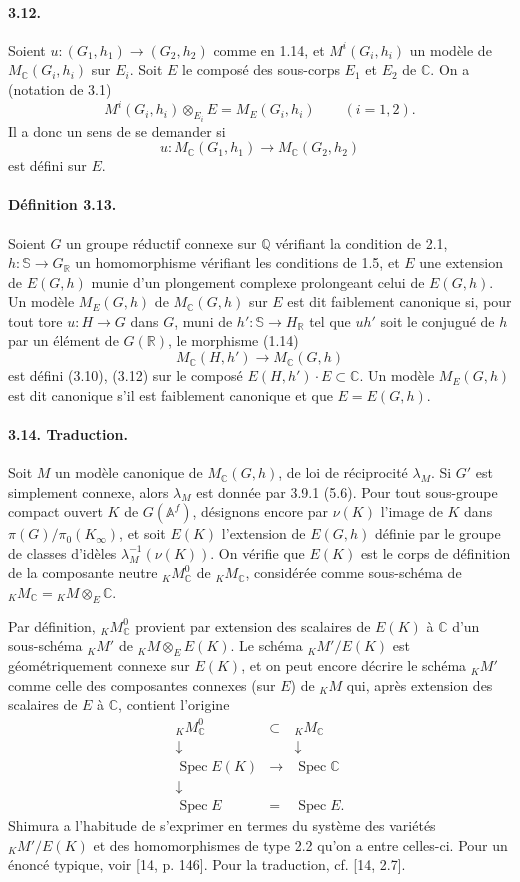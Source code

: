 \documentclass[10pt]{article}
\newcommand{\Af}{\mathbb A^f}
\newcommand{\C}{\mathbb C}
\newcommand{\Q}{\mathbb Q}
\newcommand{\R}{\mathbb R}
\newcommand{\bS}{\mathbb S}
\newcommand{\MC}{M_{\C}}
\newcommand{\Spec}{\operatorname{Spec}}
\begin{document}
\paragraph{3.12.} Soient $u:(G_1,h_1)\to(G_2,h_2)$ comme en 1.14, et $M^i(G_i,h_i)$ un modèle de $\MC(G_i,h_i)$ sur $E_i$. Soit $E$ le composé des sous-corps $E_1$ et $E_2$ de $\C$. On a (notation de 3.1)
\[
M^i(G_i,h_i)\otimes_{E_i}E=M_E(G_i,h_i)\qquad(i=1,2).
\]
Il a donc un sens de se demander si
\[
u:\MC(G_1,h_1)\longrightarrow\MC(G_2,h_2)
\]
est défini sur $E$.

\paragraph{Définition 3.13.} Soient $G$ un groupe réductif connexe sur $\Q$ vérifiant la condition de 2.1, $h:\bS\to G_\R$ un homomorphisme vérifiant les conditions de 1.5, et $E$ une extension de $E(G,h)$ munie d'un plongement complexe prolongeant celui de $E(G,h)$. Un modèle $M_E(G,h)$ de $\MC(G,h)$ sur $E$ est dit faiblement canonique si, pour tout tore $u:H\to G$ dans $G$, muni de $h':\bS\to H_\R$ tel que $uh'$ soit le conjugué de $h$ par un élément de $G(\R)$, le morphisme (1.14)
\[
\MC(H,h')\longrightarrow\MC(G,h)
\]
est défini (3.10), (3.12) sur le composé $E(H,h')\cdot E\subset\C$. Un modèle $M_E(G,h)$ est dit canonique s'il est faiblement canonique et que $E=E(G,h)$.

\paragraph{3.14. Traduction.} Soit $M$ un modèle canonique de $\MC(G,h)$, de loi de réciprocité $\lambda_M$. Si $G'$ est simplement connexe, alors $\lambda_M$ est donnée par 3.9.1 (5.6). Pour tout sous-groupe compact ouvert $K$ de $G(\Af)$, désignons encore par $\nu(K)$ l'image de $K$ dans $\pi(G)/\pi_0(K_\infty)$, et soit $E(K)$ l'extension de $E(G,h)$ définie par le groupe de classes d'idèles $\lambda_M^{-1}(\nu(K))$. On vérifie que $E(K)$ est le corps de définition de la composante neutre ${}_K\MC^0$ de ${}_K\MC$, considérée comme sous-schéma de ${}_K\MC={}_K M\otimes_E\C$.

Par définition, ${}_K\MC^0$ provient par extension des scalaires de $E(K)$ à $\C$ d'un sous-schéma ${}_K M'$ de ${}_K M\otimes_EE(K)$. Le schéma ${}_K M'/E(K)$ est géométriquement connexe sur $E(K)$, et on peut encore décrire le schéma ${}_K M'$ comme celle des composantes connexes (sur $E$) de ${}_K M$ qui, après extension des scalaires de $E$ à $\C$, contient l'origine
\[
\begin{array}{ccc}
{}_K\MC^0&\subset&{}_K\MC\\
\downarrow&&\downarrow\\
\Spec E(K)&\longrightarrow&\Spec\C\\
\downarrow&&\\
\Spec E&=&\Spec E.
\end{array}
\]
Shimura a l'habitude de s'exprimer en termes du système des variétés ${}_K M'/E(K)$ et des homomorphismes de type 2.2 qu'on a entre celles-ci. Pour un énoncé typique, voir [14, p. 146]. Pour la traduction, cf. [14, 2.7].
\end{document}
